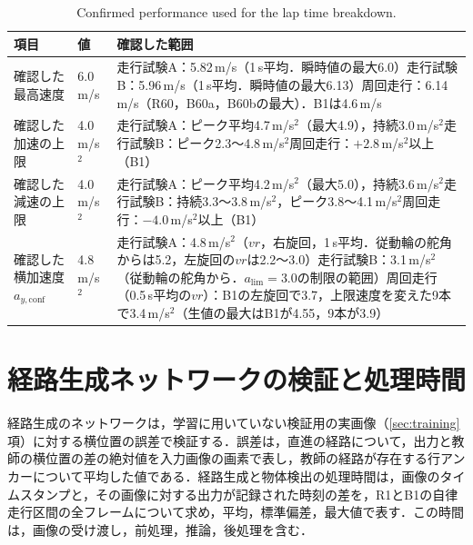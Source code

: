 \begin{table}[!htbp]
  \centering
  \caption{Confirmed performance used for the lap time breakdown.}
  \label{tab:phys}
  \small
  \begin{lrbox}{\tblbox}\setlength{\tabcolsep}{4pt}\begin{tabular}{L{3.2cm}L{1.8cm}L{9.7cm}}
    \toprule
    項目 & 値 & 確認した範囲 \\
    \midrule
    確認した最高速度 & 6.0\,m/s & 走行試験A：5.82\,m/s（1\,s平均．瞬時値の最大6.0）\newline 走行試験B：5.96\,m/s（1\,s平均．瞬時値の最大6.13）\newline 周回走行：6.14\,m/s（R60，B60a，B60bの最大）．B1は4.6\,m/s \\
    確認した加速の上限 & 4.0\,m/s$^2$ & 走行試験A：ピーク平均4.7\,m/s$^2$（最大4.9），持続3.0\,m/s$^2$\newline 走行試験B：ピーク2.3〜4.8\,m/s$^2$\newline 周回走行：$+2.8$\,m/s$^2$以上（B1） \\
    確認した減速の上限 & 4.0\,m/s$^2$ & 走行試験A：ピーク平均4.2\,m/s$^2$（最大5.0），持続3.6\,m/s$^2$\newline 走行試験B：持続3.3〜3.8\,m/s$^2$，ピーク3.8〜4.1\,m/s$^2$\newline 周回走行：$-4.0$\,m/s$^2$以上（B1） \\
    確認した横加速度$a_{y,\mathrm{conf}}$ & 4.8\,m/s$^2$ & 走行試験A：4.8\,m/s$^2$（$vr$，右旋回，1\,s平均．従動輪の舵角からは5.2，左旋回の$vr$は2.2〜3.0）\newline 走行試験B：3.1\,m/s$^2$（従動輪の舵角から．$a_{\mathrm{lim}}=3.0$の制限の範囲）\newline 周回走行（0.5\,s平均の$vr$）：B1の左旋回で3.7，上限速度を変えた9本で3.4\,m/s$^2$（生値の最大はB1が4.55，9本が3.9） \\
    \bottomrule
  \end{tabular}\end{lrbox}\usebox{\tblbox}
\end{table}

\section{経路生成ネットワークの検証と処理時間}
\label{sec:proc_time}
経路生成のネットワークは，学習に用いていない検証用の実画像（\ref{sec:training}項）に対する横位置の誤差で検証する．誤差は，直進の経路について，出力と教師の横位置の差の絶対値を入力画像の画素で表し，教師の経路が存在する行アンカーについて平均した値である．経路生成と物体検出の処理時間は，画像のタイムスタンプと，その画像に対する出力が記録された時刻の差を，R1とB1の自律走行区間の全フレームについて求め，平均，標準偏差，最大値で表す．この時間は，画像の受け渡し，前処理，推論，後処理を含む．

